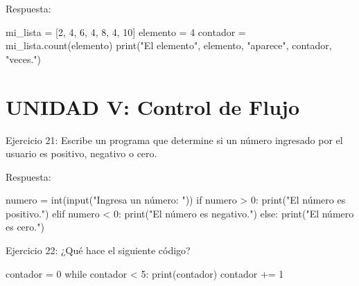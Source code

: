 \documentclass[
  a4paper,
  onepage,
  openany]{scrreprt}
\newenvironment{Shaded}{\begin{snugshade}}{\end{snugshade}}
\newcommand{\BuiltInTok}[1]{\textcolor[rgb]{0.00,0.23,0.31}{#1}}
\newcommand{\ControlFlowTok}[1]{\textcolor[rgb]{0.00,0.23,0.31}{#1}}
\newcommand{\DecValTok}[1]{\textcolor[rgb]{0.68,0.00,0.00}{#1}}
\newcommand{\NormalTok}[1]{\textcolor[rgb]{0.00,0.23,0.31}{#1}}
\newcommand{\OperatorTok}[1]{\textcolor[rgb]{0.37,0.37,0.37}{#1}}
\newcommand{\StringTok}[1]{\textcolor[rgb]{0.13,0.47,0.30}{#1}}
\begin{document}
Respuesta:

\begin{Shaded}
\begin{Highlighting}[]
\NormalTok{mi\_lista }\OperatorTok{=}\NormalTok{ [}\DecValTok{2}\NormalTok{, }\DecValTok{4}\NormalTok{, }\DecValTok{6}\NormalTok{, }\DecValTok{4}\NormalTok{, }\DecValTok{8}\NormalTok{, }\DecValTok{4}\NormalTok{, }\DecValTok{10}\NormalTok{]}
\NormalTok{elemento }\OperatorTok{=} \DecValTok{4}
\NormalTok{contador }\OperatorTok{=}\NormalTok{ mi\_lista.count(elemento)}
\BuiltInTok{print}\NormalTok{(}\StringTok{"El elemento"}\NormalTok{, elemento, }\StringTok{"aparece"}\NormalTok{, contador, }\StringTok{"veces."}\NormalTok{)}
\end{Highlighting}
\end{Shaded}

\hypertarget{unidad-v-control-de-flujo-1}{%
\section{UNIDAD V: Control de Flujo}\label{unidad-v-control-de-flujo-1}}

Ejercicio 21: Escribe un programa que determine si un número ingresado
por el usuario es positivo, negativo o cero.

Respuesta:

\begin{Shaded}
\begin{Highlighting}[]
\NormalTok{numero }\OperatorTok{=} \BuiltInTok{int}\NormalTok{(}\BuiltInTok{input}\NormalTok{(}\StringTok{"Ingresa un número: "}\NormalTok{))}
\ControlFlowTok{if}\NormalTok{ numero }\OperatorTok{\textgreater{}} \DecValTok{0}\NormalTok{:}
    \BuiltInTok{print}\NormalTok{(}\StringTok{"El número es positivo."}\NormalTok{)}
\ControlFlowTok{elif}\NormalTok{ numero }\OperatorTok{\textless{}} \DecValTok{0}\NormalTok{:}
    \BuiltInTok{print}\NormalTok{(}\StringTok{"El número es negativo."}\NormalTok{)}
\ControlFlowTok{else}\NormalTok{:}
    \BuiltInTok{print}\NormalTok{(}\StringTok{"El número es cero."}\NormalTok{)}
\end{Highlighting}
\end{Shaded}

Ejercicio 22: ¿Qué hace el siguiente código?

\begin{Shaded}
\begin{Highlighting}[]
\NormalTok{contador }\OperatorTok{=} \DecValTok{0}
\ControlFlowTok{while}\NormalTok{ contador }\OperatorTok{\textless{}} \DecValTok{5}\NormalTok{:}
    \BuiltInTok{print}\NormalTok{(contador)}
\NormalTok{    contador }\OperatorTok{+=} \DecValTok{1}
\end{Highlighting}
\end{Shaded}
\end{document}
